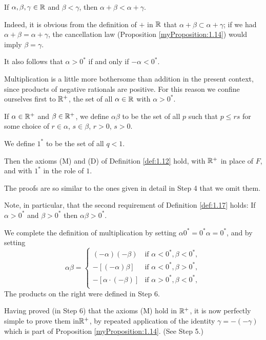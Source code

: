 If $\alpha, \beta, \gamma \in {\protect\mathbb R}$ and $\beta < \gamma$, then $\alpha + \beta < \alpha + \gamma$.

Indeed, it is obvious from the definition of $+$ in ${\protect\mathbb R}$ that $\alpha + \beta \subset \alpha + \gamma$; 
if we had $\alpha + \beta = \alpha + \gamma$, 
the cancellation law (Proposition \ref{myProposition:1.14}) would imply $\beta = \gamma$.

It also follows that $\alpha > 0^*$ if and only if $-\alpha < 0^*$.

Multiplication is a little more bothersome than addition in the present context, 
since products of negative rationals are positive. 
For this reason we confine ourselves first to ${\protect\mathbb R}^+$, 
the set of all $\alpha \in {\protect\mathbb R}$ with $\alpha > 0^*$.

If $\alpha \in {\protect\mathbb R}^+$ and $\beta \in {\protect\mathbb R}^+$, 
we define $\alpha\beta$ to be the set of all $p$ such that $p \leq rs$
for some choice of $r \in \alpha$, $s \in \beta$, $r>0$, $s>0$.

We define $1^*$ to be the set of all $q < 1$.

Then the axioms (M) and (D) of Definition \ref{def:1.12} hold, 
with ${\protect\mathbb R}^+$ in place of $F$, and with $1^*$ in the role of $1$.

The proofs are so similar to the ones given in detail in Step 4 that we omit them.

Note, in particular, that the second requirement of Definition \ref{def:1.17} holds:
If $\alpha > 0^*$ and $\beta > 0^*$ then $\alpha\beta > 0^*$.

We complete the definition of multiplication 
by setting $\alpha 0^* = 0^* \alpha = 0^*$,
and by setting
\begin{equation*}
    \alpha\beta = \left\{
        \begin{array}{ll}
            (-\alpha)(-\beta) & \text{if } \alpha < 0^*, \beta < 0^*,\\
            -[(-\alpha)\beta] & \text{if } \alpha < 0^*, \beta > 0^*,\\
            -[\alpha\cdot(-\beta)] & \text{if } \alpha > 0^*, \beta < 0^*,\\
        \end{array}
    \right.
\end{equation*}
The products on the right were defined in Step 6.

Having proved (in Step 6) that the axioms (M) hold in ${\protect\mathbb R}^+$, 
it is now perfectly simple to prove them in${\protect\mathbb R}^+$, 
by repeated application of the identity $\gamma = -(-\gamma)$ 
which is part of Proposition \ref{myProposition:1.14}. (See Step 5.)


